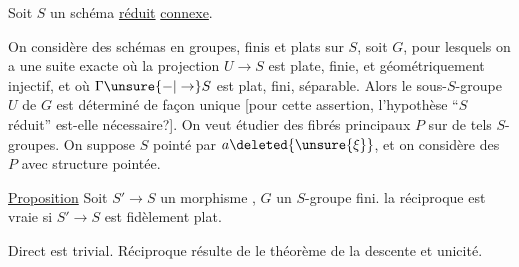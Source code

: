 Soit $S$ un schéma \uline{réduit} \uline{connexe}.

On considère des schémas en groupes, finis et plats sur $S$, soit $G$, pour lesquels on a une suite exacte
où la projection $U\to S$ est plate, finie,  et géométriquement  injectif, et où $\Gamma\unsure{-|\to}S$ est plat, fini, séparable. Alors le sous-$S$-groupe $U$ de $G$ est déterminé de façon unique [pour cette assertion, l'hypothèse ``$S$ réduit'' est-elle nécessaire?].
On veut étudier des fibrés principaux  $P$ sur de tels $S$-groupes. On suppose $S$ pointé par $a\deleted{\unsure{\xi}}$, et on considère des $P$ avec structure pointée.

\uline{Proposition}  Soit $S'\to S$ un morphisme , $G$ un $S$-groupe fini.    la réciproque est vraie si $S'\to S$ est fidèlement plat.

Direct est trivial. Réciproque résulte de le théorème de la descente et unicité.
